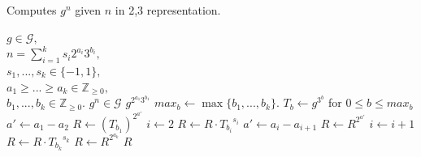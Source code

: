 \documentclass{ucalgthes1}
\theoremstyle{plain}
\theoremstyle{definition}
\newcommand{\ZZgez}{\mathbb{Z}_{\ge 0}}
\begin{document}
\begin{algorithm}[htb!]
\caption{Computes $g^n$ given $n$ in 2,3 representation.}\label{alg:yaos}
\begin{algorithmic}[1]
\REQUIRE $g \in \mathcal G,$ \\
$n = \sum_{i=1}^k s_i2^{a_i}3^{b_i},$ \\
$s_1,...,s_k \in \{-1, 1\},$ \\
$a_1 \ge ... \ge a_k \in \ZZgez,$ \\
$b_1,...,b_k \in \ZZgez.$
\ENSURE $g^n \in \mathcal G$
	\RETURN $g^{2^{a_1} 3^{b_1}}$
\ENDIF
\STATE $max_b \gets \max \{ b_1, ..., b_k \}$.
\STATE $T_b \gets g^{3^b}$ for $0 \le b \le max_b$ 
\STATE $a' \gets a_1-a_2$
\STATE $R \gets \left( T_{b_1} \right)^{2^{a'}}$ 
\STATE $i \gets 2$
	\STATE $R \gets R \cdot {T_{b_i}}^{s_i}$
	\STATE $a' \gets a_i - a_{i+1}$
	\STATE $R \gets R ^ {2^{a'}}$ 
	\STATE $i \gets i + 1$
\ENDWHILE
\STATE $R \gets R \cdot {T_{b_k}}^{s_k}$
\STATE $R \gets R ^ {2^{a_k}}$ 
\RETURN $R$
\end{algorithmic}
\end{algorithm}
\end{document}

